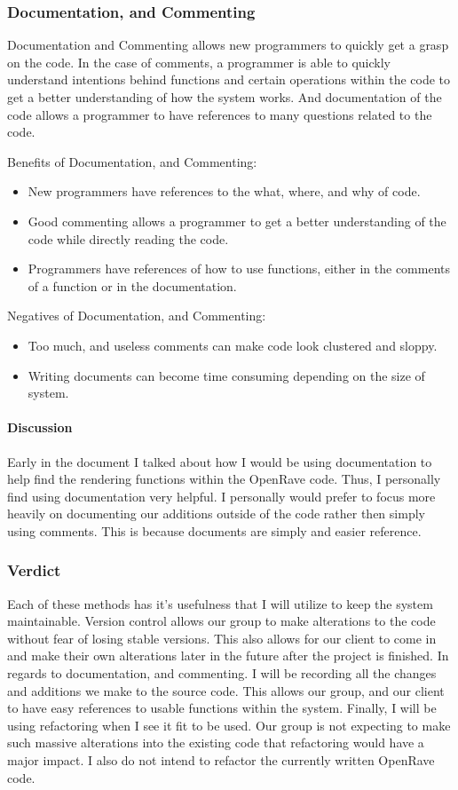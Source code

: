 \documentclass[10pt,journal,compsoc,draftclsnofoot]{IEEEtran}
\begin{document}
\subsubsection{Documentation, and Commenting}
Documentation and Commenting allows new programmers to quickly get a grasp on the code.
In the case of comments, a programmer is able to quickly understand intentions behind functions and certain operations within the code to get a better understanding of how the system works.
And documentation of the code allows a programmer to have references to many questions related to the code.

Benefits of Documentation, and Commenting:
\begin{itemize}
\item New programmers have references to the what, where, and why of code.
\item Good commenting allows a programmer to get a better understanding of the code while directly reading the code.
\item Programmers have references of how to use functions, either in the comments of a function or in the documentation.
\end{itemize}

Negatives of Documentation, and Commenting:
\begin{itemize}
\item Too much, and useless comments can make code look clustered and sloppy.
\item Writing documents can become time consuming depending on the size of system.
\end{itemize}

\paragraph{Discussion}
Early in the document I talked about how I would be using documentation to help find the rendering functions within the OpenRave code.
Thus, I personally find using documentation very helpful.
I personally would prefer to focus more heavily on documenting our additions outside of the code rather then simply using comments.
This is because documents are simply and easier reference.

\subsubsection{Verdict}
Each of these methods has it's usefulness that I will utilize to keep the system maintainable.
Version control allows our group to make alterations to the code without fear of losing stable versions.
This also allows for our client to come in and make their own alterations later in the future after the project is finished.
In regards to documentation, and commenting.
I will be recording all the changes and additions we make to the source code.
This allows our group, and our client to have easy references to usable functions within the system.
Finally, I will be using refactoring when I see it fit to be used.
Our group is not expecting to make such massive alterations into the existing code that refactoring would have a major impact.
I also do not intend to refactor the currently written OpenRave code.
\end{document}
